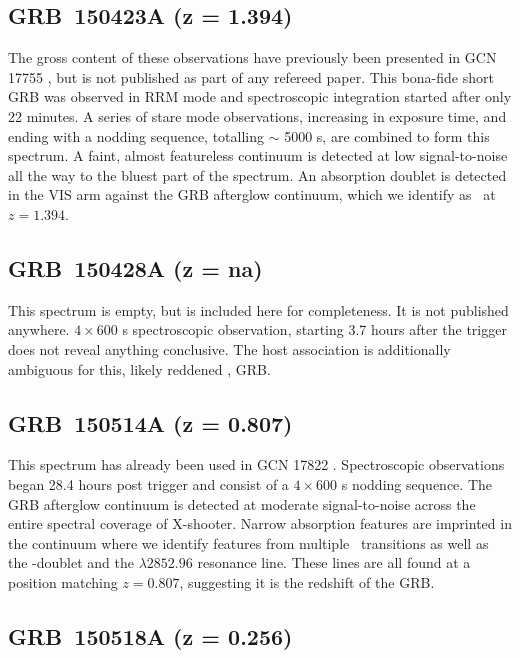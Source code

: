 \documentclass[longauth]{aa}    %
\begin{document}
\subsection{GRB~150423A (z = 1.394)}\label{150423}

The gross content of these observations have previously been presented in GCN
17755 \citep{GCN17755}, but is not published as part of any refereed paper. This
bona-fide short GRB \citep[T90 = is $ 0.22 \pm 0.03$ s;][]{Lien2016} was
observed in RRM mode and spectroscopic integration started after only 22
minutes. A series of stare mode observations, increasing in exposure time, and
ending with a nodding sequence, totalling $\sim$ 5000 s, are combined to form
this spectrum. A faint, almost featureless continuum is detected at low
signal-to-noise all the way to the bluest part of the spectrum. An absorption
doublet is detected in the VIS arm against the GRB afterglow continuum, which we
identify as \mgii~at $z = 1.394$.

\subsection{GRB~150428A (z = na)}	\label{150428}

This spectrum is empty, but is included here for completeness. It is not
published anywhere. $4\times600$ s spectroscopic observation, starting 3.7
hours after the trigger does not reveal anything conclusive. The host
association is additionally ambiguous for this, likely reddened \citep[GCN
17767;][]{GCN17767}, GRB.

\subsection{GRB~150514A (z = 0.807)}\label{150514}

This spectrum has already been used in GCN 17822 \citep{GCN17822}. Spectroscopic
observations began 28.4 hours post trigger and consist of a $4 \times 600$ s
nodding sequence. The GRB afterglow continuum is detected at moderate
signal-to-noise across the entire spectral coverage of X-shooter. Narrow
absorption features are imprinted in the continuum where we identify features
from multiple \feii~transitions as well as the \mgii-doublet and the
\mgi$\lambda2852.96$ resonance line. These lines are all found at a position
matching $z = 0.807$, suggesting it is the redshift of the GRB.

\subsection{GRB~150518A (z = 0.256)}\label{150518}
\end{document}
